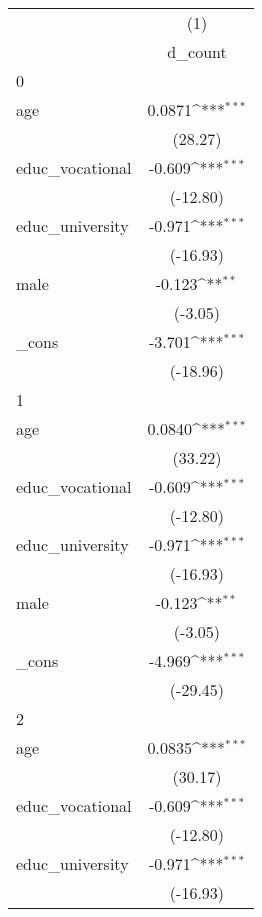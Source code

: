 {
\def\sym#1{\ifmmode^{#1}\else\(^{#1}\)\fi}
\begin{tabular}{l*{1}{c}}
\hline\hline
            &\multicolumn{1}{c}{(1)}\\
            &\multicolumn{1}{c}{d\_count}\\
\hline
0           &                     \\
age         &      0.0871\sym{***}\\
            &     (28.27)         \\
[1em]
educ\_vocational&      -0.609\sym{***}\\
            &    (-12.80)         \\
[1em]
educ\_university&      -0.971\sym{***}\\
            &    (-16.93)         \\
[1em]
male        &      -0.123\sym{**} \\
            &     (-3.05)         \\
[1em]
\_cons      &      -3.701\sym{***}\\
            &    (-18.96)         \\
\hline
1           &                     \\
age         &      0.0840\sym{***}\\
            &     (33.22)         \\
[1em]
educ\_vocational&      -0.609\sym{***}\\
            &    (-12.80)         \\
[1em]
educ\_university&      -0.971\sym{***}\\
            &    (-16.93)         \\
[1em]
male        &      -0.123\sym{**} \\
            &     (-3.05)         \\
[1em]
\_cons      &      -4.969\sym{***}\\
            &    (-29.45)         \\
\hline
2           &                     \\
age         &      0.0835\sym{***}\\
            &     (30.17)         \\
[1em]
educ\_vocational&      -0.609\sym{***}\\
            &    (-12.80)         \\
[1em]
educ\_university&      -0.971\sym{***}\\
            &    (-16.93)         \\

\end{tabular}}
